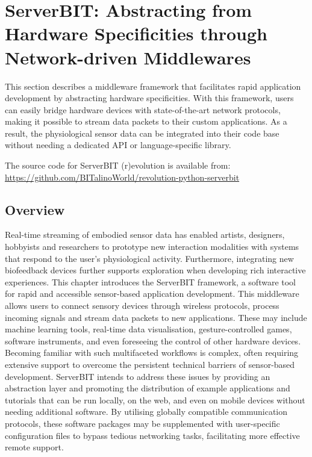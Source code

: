 \section{ServerBIT: Abstracting from Hardware Specificities through Network-driven Middlewares}
\label{technical_contributions:severbit}

This section describes a middleware framework that facilitates rapid application development by abstracting hardware specificities. With this framework, users can easily bridge hardware devices with state-of-the-art network protocols, making it possible to stream data packets to their custom applications. As a result, the physiological sensor data can be integrated into their code base without needing a dedicated API or language-specific library.

The source code for ServerBIT (r)evolution is available from:
\url{https://github.com/BITalinoWorld/revolution-python-serverbit}

\subsection*{Overview}

Real-time streaming of embodied sensor data has enabled artists, designers, hobbyists and researchers to prototype new interaction modalities with systems that respond to the user’s physiological activity. Furthermore, integrating new biofeedback devices further supports exploration when developing rich interactive experiences. This chapter introduces the ServerBIT framework, a software tool for rapid and accessible sensor-based application development. This middleware allows users to connect sensory devices through wireless protocols, process incoming signals and stream data packets to new applications. These may include machine learning tools, real-time data visualisation, gesture-controlled games, software instruments, and even foreseeing the control of other hardware devices. Becoming familiar with such multifaceted workflows is complex, often requiring extensive support to overcome the persistent technical barriers of sensor-based development. ServerBIT intends to address these issues by providing an abstraction layer and promoting the distribution of example applications and tutorials that can be run locally, on the web, and even on mobile devices without needing additional software. By utilising globally compatible communication protocols, these software packages may be supplemented with user-specific configuration files to bypass tedious networking tasks, facilitating more effective remote support.

